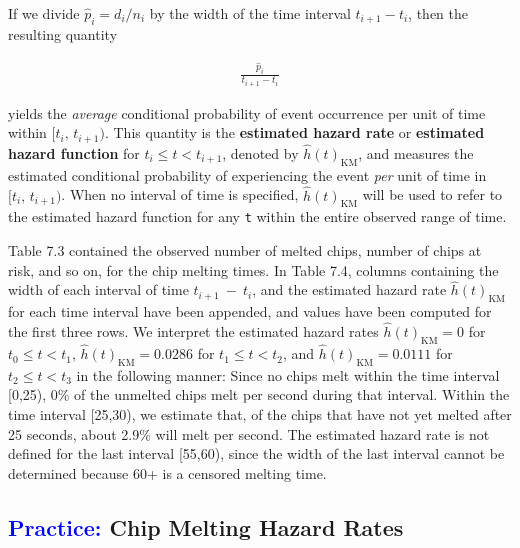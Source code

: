 \documentclass[
]{report}
\begin{document}
If we divide \(\scriptstyle \hat p_i = d_i/n_i\) by the width of the time interval \(\scriptstyle t_{i+1}-t_i\), then the resulting quantity

\begin{align}\label{9.15}
\frac{\hat p_i}{t_{i+1} - t_i}
\tag{7.15}
\end{align}

yields the \emph{average} conditional probability of event occurrence per unit of time within \(\scriptstyle [t_i,\,t_{i+1})\). This quantity is the \textbf{estimated hazard rate} or \textbf{estimated hazard function} for \(\scriptstyle t_i \le t < t_{i+1}\), denoted by \(\scriptstyle \hat h(t)_{\mathrm{KM}}\), and measures the estimated conditional probability of experiencing the event \emph{per} unit of time in \(\scriptstyle [t_i,\,t_{i+1})\). When no interval of time is specified, \(\scriptstyle \hat h(t)_{\mathrm{KM}}\) will be used to refer to the estimated hazard function for any \texttt{t} within the entire observed range of time.

Table 7.3 contained the observed number of melted chips, number of chips at risk, and so on, for the chip melting times. In Table 7.4, columns containing the width of each interval of time \(\scriptstyle t_{i+1} \ -\  t_i\), and the estimated hazard rate \(\scriptstyle \hat h(t)_{\mathrm{KM}}\) for each time interval have been appended, and values have been computed for the first three rows. We interpret the estimated hazard rates \(\scriptstyle \hat h(t)_{\mathrm{KM}} = 0\) for \(\scriptstyle t_0 \le t < t_1\), \(\scriptstyle \hat h(t)_{\mathrm{KM}} = 0.0286\) for \(\scriptstyle t_1 \le t < t_2\), and \(\scriptstyle \hat h(t)_{\mathrm{KM}} = 0.0111\) for \(\scriptstyle t_2 \le t < t_3\) in the following manner: Since no chips melt within the time interval {[}0,25), 0\% of the unmelted chips melt per second during that interval. Within the time interval {[}25,30), we estimate that, of the chips that have not yet melted after 25 seconds, about 2.9\% will melt per second. The estimated hazard rate is not defined for the last interval {[}55,60), since the width of the last interval cannot be determined because 60+ is a censored melting time.

\hypertarget{chip-melting-hazard-rates}{%
\subsection*{\texorpdfstring{\textcolor{blue}{Practice:} Chip Melting Hazard Rates}{ Chip Melting Hazard Rates}}\label{chip-melting-hazard-rates}}
\end{document}
